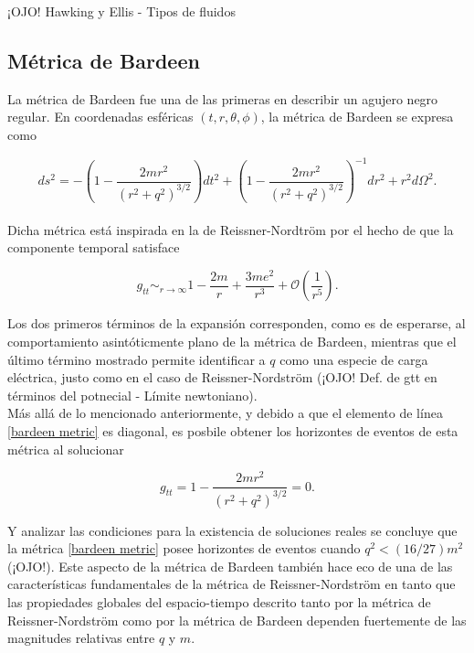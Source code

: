 \documentclass[prb,aps,preprintnumbers,amsmath,amssymb]{article}
\numberwithin{equation}{section}
\begin{document}
¡OJO! Hawking y Ellis - Tipos de fluidos

\subsection{Métrica de Bardeen}

La métrica de Bardeen \cite{bardeen,borde-1994,borde-1996} fue una de las primeras en describir un agujero negro regular. En coordenadas esféricas $(t,r,\theta,\phi)$, la métrica de Bardeen se expresa como

\begin{equation}
\label{bardeen metric}
ds^2 = -\left( 1 - \frac{2mr^2}{(r^2 + q^2)^{3/2}} \right)dt^2 + \left( 1 - \frac{2mr^2}{(r^2 + q^2)^{3/2}} \right)^{-1}dr^2 + r^2d\Omega^2.
\end{equation}\\

Dicha métrica está inspirada en la de Reissner-Nordtröm por el hecho de que la componente temporal satisface

\begin{equation}
g_{tt} \sim_{r \to \infty} 1 - \frac{2m}{r} + \frac{3me^2}{r^3} + \mathcal{O}\left( \frac{1}{r^5} \right).
\end{equation}

Los dos primeros términos de la expansión corresponden, como es de esperarse, al comportamiento asintóticmente plano de la métrica de Bardeen, mientras que el último término mostrado permite identificar a $q$ como una especie de carga eléctrica, justo como en el caso de Reissner-Nordström (¡OJO! Def. de gtt en términos del potnecial - Límite newtoniano).\\

Más allá de lo mencionado anteriormente, y debido a que el elemento de línea \eqref{bardeen metric} es diagonal, es posbile obtener los horizontes de eventos de esta métrica al solucionar

\begin{equation}
g_{tt} = 1 - \frac{2mr^2}{(r^2 + q^2)^{3/2}} = 0.
\end{equation}

Y analizar las condiciones para la existencia de soluciones reales se concluye que la métrica \eqref{bardeen metric} posee horizontes de eventos cuando $q^2 < (16/27)m^2$ (¡OJO!). Este aspecto de la métrica de Bardeen también hace eco de una de las características fundamentales de la métrica de Reissner-Nordström en tanto que las propiedades globales del espacio-tiempo descrito tanto por la métrica de Reissner-Nordström como por la métrica de Bardeen dependen fuertemente de las magnitudes relativas entre $q$ y $m$.\\
\end{document}
